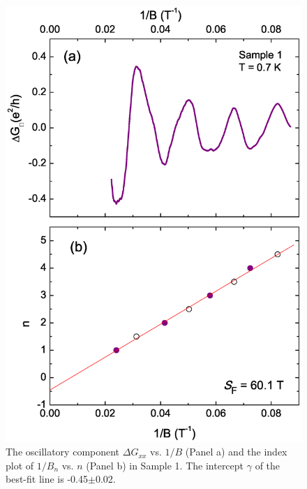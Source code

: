 \begin{figure}[!htbp]
  \begin{center}
\includegraphics[width=0.9\linewidth]{ch-bts/figures/FigGindexS1.eps}
\caption{\label{figG1} 
The oscillatory component $\Delta G_{xx}$ vs. $1/B$ (Panel a) and the 
index plot of $1/B_n$ vs. $n$ (Panel b) in Sample 1. The intercept $\gamma$ of the best-fit line 
is -0.45$\pm$0.02.}
  \end{center}
\end{figure}


